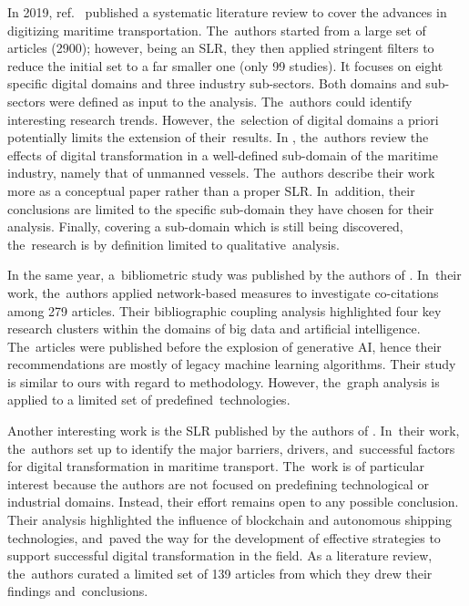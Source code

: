 \documentclass[jmse,review,accept,pdftex,moreauthors]{Definitions/mdpi}
\begin{document}
In 2019, ref.~\citep{sanchez2019toward} published a systematic literature review to cover the advances in digitizing maritime transportation. The~authors started from a large set of articles (2900); however, being an SLR, they then applied stringent filters to reduce the initial set to a far smaller one (only 99 studies). It focuses on eight specific digital domains and three industry sub-sectors. Both domains and sub-sectors were defined as input to the analysis. The~authors could identify interesting research trends. However, {the~selection of digital domains a priori potentially limits the extension of their~results. }%
In \citep{poulis2020value}, the~authors review the effects of digital transformation in a well-defined sub-domain of the maritime industry, namely that of unmanned vessels. The~authors describe their work more as a conceptual paper rather than a proper SLR. In~addition, their conclusions are limited to the specific sub-domain they have chosen for their analysis. Finally, covering a sub-domain which is still being discovered, the~research is by definition limited to qualitative~analysis.

In the same year, a~bibliometric study was published by the authors of \citep{munim2020big}. In~their work, the~authors applied network-based measures to investigate co-citations among 279 articles. Their bibliographic coupling analysis highlighted four key research clusters within the domains of big data and artificial intelligence. The~articles were published before the explosion of generative AI, hence their recommendations are mostly of legacy machine learning algorithms. Their study is similar to ours with regard to methodology. However, the~graph analysis is applied to a limited set of predefined~technologies.

Another interesting work is the SLR published by the authors of \citep{tijan2021digital}. In~their work, the~authors set up to identify the major barriers, drivers, and~successful factors for digital transformation in maritime transport. The~work is of particular interest because the authors are not focused on predefining technological or industrial domains. Instead, their effort remains open to any possible conclusion. Their analysis highlighted the influence of blockchain and autonomous shipping technologies, and~paved the way for the development of effective strategies to support successful digital transformation in the field. As a literature review, the~authors curated a limited set of 139 articles from which they drew their findings and~conclusions.
\end{document}
